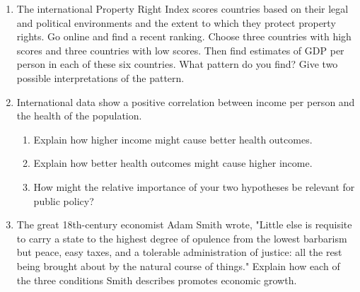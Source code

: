 \documentclass{article}
\begin{document}
\begin{enumerate}
\item The international Property Right Index scores countries based on their legal and political environments and the extent to which they protect property rights. Go online and find a recent ranking. Choose three countries with high scores and three countries with low scores. Then find estimates of GDP per person in each of these six countries. What pattern do you find? Give two possible interpretations of the pattern.

\item International data show a positive correlation between income per person and the health of the population.

	\begin{enumerate}
	
	\item Explain how higher income might cause better health outcomes.
	
	\item Explain how better health outcomes might cause higher income.
	
	\item How might the relative importance of your two hypotheses be relevant for public policy?
	
	\end{enumerate}
	
\item The great 18th-century economist Adam Smith wrote, "Little else is requisite to carry a state to the highest degree of opulence from the lowest barbarism but peace, easy taxes, and a tolerable administration of justice: all the rest being brought about by the natural course of things." Explain how each of the three conditions Smith describes promotes economic growth. 

\end{enumerate}
\end{document}
